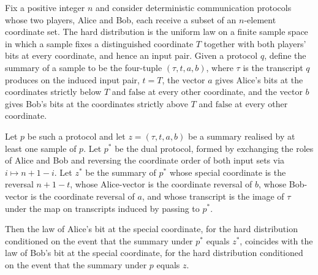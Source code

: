 \begin{theorem}
\label{CommunicationComplexity.Functions.Disjointness.RandomizedLowerBound.conditionalSpecialXLaw_dualProtocol_dualZValue}
\leanok
{}
Fix a positive integer $n$ and consider deterministic communication protocols whose two
players, Alice and Bob, each receive a subset of an $n$-element coordinate set. The hard
distribution is the uniform law on a finite sample space in which a sample fixes a
distinguished coordinate $T$ together with both players' bits at every coordinate, and
hence an input pair. Given a protocol $q$, define the summary of a sample to be the
four-tuple $(\tau, t, a, b)$, where $\tau$ is the transcript $q$ produces on the induced
input pair, $t = T$, the vector $a$ gives Alice's bits at the coordinates strictly below
$T$ and $\mathrm{false}$ at every other coordinate, and the vector $b$ gives Bob's bits
at the coordinates strictly above $T$ and $\mathrm{false}$ at every other coordinate.

Let $p$ be such a protocol and let $z = (\tau, t, a, b)$ be a summary realised by at
least one sample of $p$. Let $p^{\ast}$ be the dual protocol, formed by exchanging the
roles of Alice and Bob and reversing the coordinate order of both input sets via $i
\mapsto n+1-i$. Let $z^{\ast}$ be the summary of $p^{\ast}$ whose special coordinate is
the reversal $n+1-t$, whose Alice-vector is the coordinate reversal of $b$, whose
Bob-vector is the coordinate reversal of $a$, and whose transcript is the image of
$\tau$ under the map on transcripts induced by passing to $p^{\ast}$.

Then the law of Alice's bit at the special coordinate, for the hard distribution
conditioned on the event that the summary under $p^{\ast}$ equals $z^{\ast}$, coincides
with the law of Bob's bit at the special coordinate, for the hard distribution
conditioned on the event that the summary under $p$ equals $z$.
\end{theorem}

